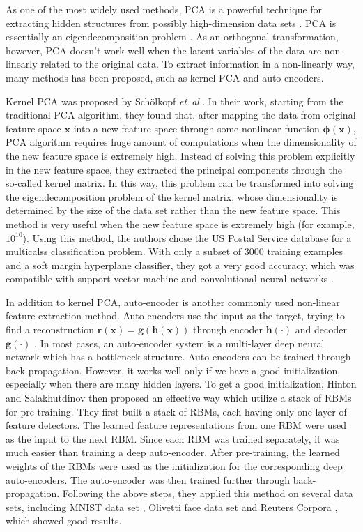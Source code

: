 \documentclass[tikz, multi,dvipsnames,svgnames,x11names]{article}
\begin{document}
As one of the most widely used methods, PCA is a powerful technique for extracting hidden structures from possibly high-dimension data sets \cite{scholkopf1998nonlinear}. PCA is essentially an eigendecomposition problem \cite{friedman2001elements}. As an orthogonal transformation, however, PCA doesn't work well when the latent variables of the data are non-linearly related to the original data. To extract information in a non-linearly way, many methods has been proposed, such as kernel PCA and auto-encoders.

Kernel PCA was proposed by Sch\"{o}lkopf {\em et~al.}\cite{scholkopf1998nonlinear}. In their work, starting from the traditional PCA algorithm, they found that, after mapping the data from original feature space $\bm{x}$ into a new feature space through some nonlinear function $\bm{\phi(\bm{x})}$, PCA algorithm requires huge amount of computations when the dimensionality of the new feature space is extremely high. Instead of solving this problem explicitly in the new feature space, they extracted the principal components through the so-called kernel matrix. In this way, this problem can be transformed into solving the eigendecomposition problem of the kernel matrix, whose dimensionality is determined by the size of the data set rather than the new feature space. This method is very useful when the new feature space is extremely high (for example, $10^{10}$). Using this method, the authors chose the US Postal Service database for a multicalss classification problem. With only a subset of $3000$ training examples and a soft margin hyperplane classifier, they got a very good accuracy, which was compatible with support vector machine and convolutional neural networks \cite{scholkopf1998nonlinear}.

In addition to kernel PCA, auto-encoder is another commonly used non-linear feature extraction method. Auto-encoders use the input as the target, trying to find a reconstruction $\bm{r(\bm{x})} = \bm{g(h(\bm{x}))}$ through encoder $\bm h(\cdot)$ and decoder $\bm g(\cdot)$ \cite{bengio2012deep}. In most cases, an auto-encoder system is a multi-layer deep neural network which has a bottleneck structure. Auto-encoders can be trained through back-propagation. However, it works well only if we have a good initialization, especially when there are many hidden layers. To get a good initialization, Hinton and Salakhutdinov \cite{hinton2006reducing} then proposed an effective way which utilize a stack of RBMs for pre-training. They first built a stack of RBMs, each having only one layer of feature detectors. The learned feature representations from one RBM were used as the input to the next RBM. Since each RBM was trained separately, it was much easier than training a deep auto-encoder. After pre-training, the learned weights of the RBMs were used as the initialization for the corresponding deep auto-encoders. The auto-encoder was then trained further through back-propagation. Following the above steps, they applied this method on several data sets, including MNIST data set \cite{lecun1998gradient}, Olivetti face data set \cite{samaria1994parameterisation} and Reuters Corpora \cite{lewis2004rcv1}, which showed good results.
\end{document}
